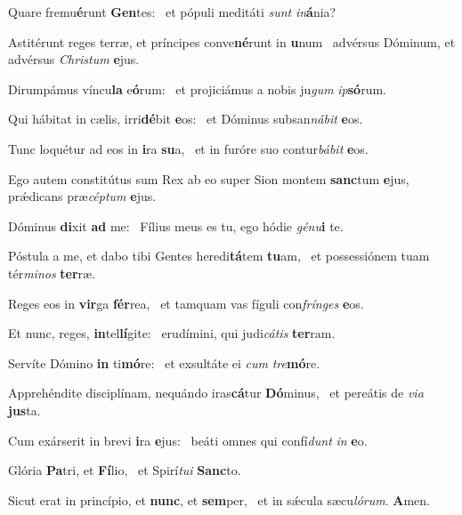 \item Quare fremu\textbf{é}runt \textbf{Gen}tes:~\psstar{} et pópuli meditáti \textit{sunt} \textit{in}\textbf{á}nia?
\item Astitérunt reges terræ, et príncipes conve\textbf{né}runt in \textbf{u}num~\psstar{} advérsus Dóminum, et advérsus \textit{Christum} \textbf{e}jus.
\item Dirumpámus víncu\textbf{la} e\textbf{ó}rum:~\psstar{} et projiciámus a nobis ju\textit{gum} \textit{ip}\textbf{só}rum.
\item Qui hábitat in cælis, irri\textbf{dé}bit \textbf{e}os:~\psstar{} et Dóminus subsan\textit{nábit} \textbf{e}os.
\item Tunc loquétur ad eos in \textbf{i}ra \textbf{su}a,~\psstar{} et in furóre suo contur\textit{bábit} \textbf{e}os.
\item Ego autem constitútus sum Rex ab eo super Sion montem \textbf{sanc}tum \textbf{e}jus,~\psstar{} prǽdicans præ\textit{céptum} \textbf{e}jus.
\item Dóminus \textbf{di}xit \textbf{ad} me:~\psstar{} Fílius meus es tu, ego hódie \textit{génu}\textbf{i} te.
\item Póstula a me, et dabo tibi Gentes heredi\textbf{tá}tem \textbf{tu}am,~\psstar{} et possessiónem tuam tér\textit{minos} \textbf{ter}ræ.
\item Reges eos in \textbf{vir}ga \textbf{fér}rea,~\psstar{} et tamquam vas fíguli con\textit{frínges} \textbf{e}os.
\item Et nunc, reges, \textbf{in}tel\textbf{lí}gite:~\psstar{} erudímini, qui judi\textit{cátis} \textbf{ter}ram.
\item Servíte Dómino \textbf{in} ti\textbf{mó}re:~\psstar{} et exsultáte ei \textit{cum} \textit{tre}\textbf{mó}re.
\item Apprehéndite disciplínam, nequándo iras\textbf{cá}tur \textbf{Dó}minus,~\psstar{} et pereátis de \textit{via} \textbf{jus}ta.
\item Cum exárserit in brevi \textbf{i}ra \textbf{e}jus:~\psstar{} beáti omnes qui confí\textit{dunt} \textit{in} \textbf{e}o.
\item Glória \textbf{Pa}tri, et \textbf{Fí}lio,~\psstar{} et Spirí\textit{tui} \textbf{Sanc}to.
\item Sicut erat in princípio, et \textbf{nunc}, et \textbf{sem}per,~\psstar{} et in sǽcula sæcu\textit{lórum}. \textbf{A}men.
